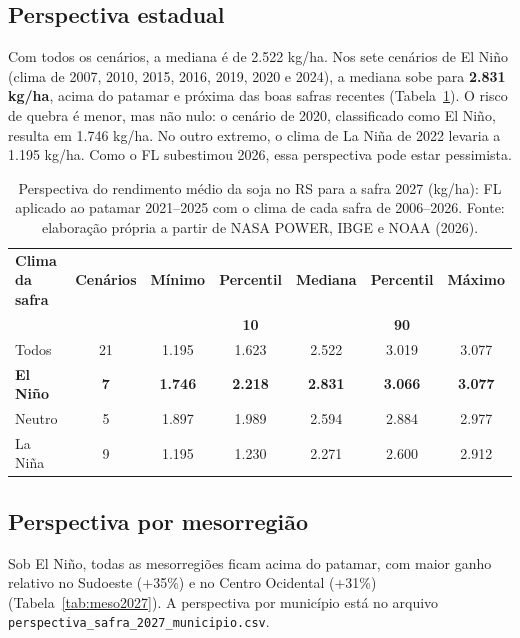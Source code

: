 \documentclass[12pt]{article}
\begin{document}
\subsection{Perspectiva estadual}

Com todos os cenários, a mediana é de 2.522 kg/ha. Nos sete cenários de
El Niño (clima de 2007, 2010, 2015, 2016, 2019, 2020 e 2024), a mediana
sobe para \textbf{2.831 kg/ha}, acima do patamar e próxima das boas
safras recentes (Tabela~\ref{tab:prev2027}). O risco de quebra é menor,
mas não nulo: o cenário de 2020, classificado como El Niño, resulta em
1.746 kg/ha. No outro extremo, o clima de La Niña de 2022 levaria a 1.195
kg/ha. Como o FL subestimou 2026, essa perspectiva pode estar pessimista.

\begin{table}[ht]
\centering
\caption{Perspectiva do rendimento médio da soja no RS para a safra 2027
  (kg/ha): FL aplicado ao patamar 2021--2025 com o clima de cada safra de
  2006--2026. Fonte: elaboração própria a partir de NASA POWER, IBGE e
  NOAA (2026).}
\label{tab:prev2027}
\small
\begin{tabular}{|p{2.6cm}|c|c|c|c|c|c|}
\hline
\textbf{Clima da safra} & \textbf{Cenários} & \textbf{Mínimo} &
  \textbf{Percentil} & \textbf{Mediana} & \textbf{Percentil} &
  \textbf{Máximo} \\
 & & & \textbf{10} & & \textbf{90} & \\ \hline
Todos & 21 & 1.195 & 1.623 & 2.522 & 3.019 & 3.077 \\ \hline
\textbf{El Niño} & \textbf{7} & \textbf{1.746} & \textbf{2.218} &
  \textbf{2.831} & \textbf{3.066} & \textbf{3.077} \\ \hline
Neutro & 5 & 1.897 & 1.989 & 2.594 & 2.884 & 2.977 \\ \hline
La Niña & 9 & 1.195 & 1.230 & 2.271 & 2.600 & 2.912 \\ \hline
\end{tabular}
\end{table}

\subsection{Perspectiva por mesorregião}

Sob El Niño, todas as mesorregiões ficam acima do patamar, com maior
ganho relativo no Sudoeste (+35\%) e no Centro Ocidental (+31\%)
(Tabela~\ref{tab:meso2027}). A perspectiva por município está no arquivo
\texttt{perspectiva\_safra\_2027\_municipio.csv}.
\end{document}
